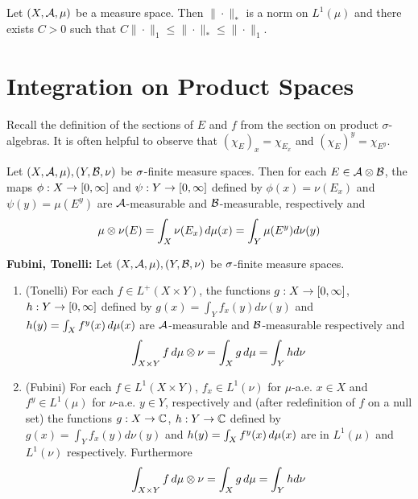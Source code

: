 \documentclass{book}
\begin{document}
	\begin{ex} 
	Let $(X, \mathcal{A}, \mu)$ be a measure space. Then $\| \cdot \|_*$ is a norm on $L^1(\mu)$ and there exists $C >0$ such that $C\|\cdot\|_1 \leq \|\cdot\|_* \leq \| \cdot \|_1$.
	\end{ex}
	
	
	
	
	
	
	
	
	
	
	\newpage
	\section{Integration on Product Spaces}
	
	\begin{note}
		Recall the definition of the sections of $E$ and $f$ from the section on product $\sigma$-algebras. It is often helpful to observe that $(\chi_E)_x = \chi_{E_x}$ and $(\chi_E)^y = \chi_{E^y}$.
	\end{note}
	
	\begin{thm}
		Let $(X,\mathcal{A}, \mu), (Y, \mathcal{B}, \nu)$ be $\sigma$-finite measure spaces. Then for each $E \in \mathcal{A} \otimes \mathcal{B}$, the maps $\phi:X \rightarrow [0,\infty]$ and $\psi: Y \rightarrow [0,\infty]$ defined by $\phi(x) = \nu(E_x)$ and $\psi(y) = \mu(E^y)$ are $\mathcal{A}$-measurable and $\mathcal{B}$-measurable, respectively and $$\mu \otimes \nu(E) = \int_X \nu(E_x)\, d \mu(x) = \int_Y \mu(E^y)d\nu(y)$$ 
	\end{thm}
	
	\begin{thm}\textbf{Fubini, Tonelli:}
		Let $(X,\mathcal{A}, \mu), (Y, \mathcal{B}, \nu)$ be $\sigma$-finite measure spaces. 
		
		\begin{enumerate}
			\item (Tonelli) For each $f \in L^+(X \times Y)$, the functions $g:X \rightarrow [0,\infty]$, $h:Y \rightarrow [0,\infty]$ defined by $g(x) = \int_Y f_x(y)d\nu(y)$ and $h(y) = \int_X f^y(x) \, d \mu(x)$ are $\mathcal{A}$-measurable and $\mathcal{B}$-measurable respectively and $$\int_{X \times Y}f \, d \mu \otimes \nu = \int_X g \, d \mu = \int_Y h d\nu$$
			
			\item (Fubini) For each $f \in L^1(X \times Y)$, $f_x \in L^1(\nu)$ for $\mu$-a.e. $x \in X$ and $f^y \in L^1(\mu)$ for $\nu$-a.e. $y \in Y$, respectively and (after redefinition of $f$ on a null set) the functions $g:X \rightarrow \mathbb{C}$, $h:Y \rightarrow \mathbb{C}$ defined by $g(x) = \int_Y f_x(y)d\nu(y)$ and $h(y) = \int_X f^y(x) \, d \mu(x)$ are in $L^1(\mu)$ and $L^1(\nu)$ respectively. Furthermore 
			$$\int_{X \times Y}f \, d \mu \otimes \nu = \int_X g \, d \mu = \int_Y h d\nu$$
		\end{enumerate}
	\end{thm}
	
\end{document}
